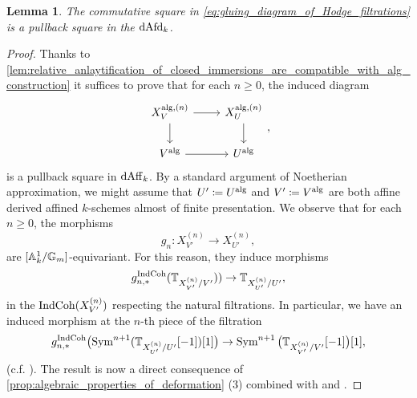 \documentclass[10pt,a4paper,reqno]{amsart} %
\theoremstyle{plain}
\newtheorem{lem}[thm]{Lemma}
\theoremstyle{definition}
\theoremstyle{remark}
\numberwithin{equation}{section}
\begin{document}
\begin{lem} \label{lem:preservation_of_Hodge_filtration_under_pullback}
    The commutative square in \eqref{eq:gluing_diagram_of_Hodge_filtrations} is a pullback square in the \infcat $\mathrm{dAfd}_k$.
\end{lem}

\begin{proof} Thanks to \cref{lem:relative_anlaytification_of_closed_immersions_are_compatible_with_alg_construction}
    it suffices to prove that for each $n \ge 0$, the induced diagram
        \[
        \begin{tikzcd}
            X_V^{\mathrm{alg}, (n)} \ar{r} \ar{d} & X_U^{\mathrm{alg}, (n)} \ar{d} \\
            V \alg \ar{r} & U\alg  
        \end{tikzcd},
        \]
    is a pullback square in $\mathrm{dAff}_k$. By a standard argument of Noetherian approximation, we might assume that $U' \coloneqq U^\mathrm{alg} $ and $V' \coloneqq V^\mathrm{alg}$ are
    both affine derived affined $k$-schemes almost of finite presentation. We observe that for each $n \ge 0$, the morphisms
        \[
            g_n \colon X_{V'}^{(n)} \to X_{U'}^{(n)},
        \]
    are $[\mathbb A^1_k/ \mathbb G_m]$-equivariant. For this reason, they induce morphisms
        \[
            g_{n, *}^\mathrm{IndCoh}( \mathbb T_{X^{(n)}_{V'}/ V'})) \to \mathbb T_{X^{(n)}_{U'} / U'}  ,
        \]
    in the \infcat $\mathrm{Ind}\mathrm{Coh}(X_{V'}^{(n)})$ respecting the natural filtrations. In particular, we have an induced morphism
    at the $n$-th piece of the filtration
        \[
                g_{n, *}^\mathrm{IndCoh}\big( \mathrm{Sym}^{n+1}(\mathbb T_{X^{(n)}_{U'}/ U'}[-1])[1]\big) \to  \operatorname{Sym}^{n+1}\big( \mathbb T_{X^{(n)}_{V'} / V'}[-1]\big)[1],
        \]
    (c.f. \cite[Theorem 9.5.1.3]{Gaitsgory_Study_II}). 
    The result is now a direct consequence of \cref{prop:algebraic_properties_of_deformation} (3)
    combined with \cite[Proposition 5.12]{Porta_Yu_Representability} and \cite[Proposition 2.5.4.5]{Lurie_SAG}.
\end{proof}
\end{document}
